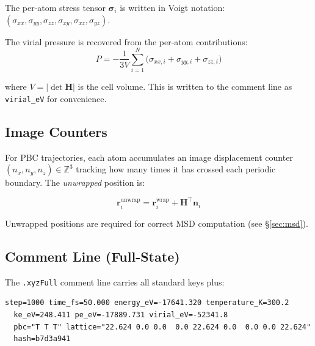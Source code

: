 \documentclass[11pt, a4paper, oneside]{article}
\newcommand{\rvec}{\mathbf{r}}
\begin{document}
The per-atom stress tensor $\boldsymbol{\sigma}_i$ is written in Voigt
notation: $({\sigma_{xx}}, {\sigma_{yy}}, {\sigma_{zz}},
{\sigma_{xy}}, {\sigma_{xz}}, {\sigma_{yz}})$.

The virial pressure is recovered from the per-atom contributions:
\begin{equation}
  P = -\frac{1}{3V} \sum_{i=1}^{N}
      \bigl(\sigma_{xx,i} + \sigma_{yy,i} + \sigma_{zz,i}\bigr)
  \label{eq:pressure}
\end{equation}

where $V = |\det\mathbf{H}|$ is the cell volume. This is written to the
comment line as \texttt{virial\_eV} for convenience.

\subsection{Image Counters}
\label{sec:xyzFull_images}

For PBC trajectories, each atom accumulates an image displacement counter
$(n_x, n_y, n_z) \in \mathbb{Z}^3$ tracking how many times it has crossed
each periodic boundary. The \emph{unwrapped} position is:

\begin{equation}
  \rvec_i^{\mathrm{unwrap}} = \rvec_i^{\mathrm{wrap}} + \mathbf{H}^\top \mathbf{n}_i
  \label{eq:unwrap}
\end{equation}

Unwrapped positions are required for correct MSD computation
(see \S\ref{sec:msd}).

\subsection{Comment Line (Full-State)}
\label{sec:xyzFull_comment}

The \texttt{.xyzFull} comment line carries all standard keys plus:

\begin{lstlisting}[caption={\texttt{.xyzFull} comment line.}]
step=1000 time_fs=50.000 energy_eV=-17641.320 temperature_K=300.2
  ke_eV=248.411 pe_eV=-17889.731 virial_eV=-52341.8
  pbc="T T T" lattice="22.624 0.0 0.0  0.0 22.624 0.0  0.0 0.0 22.624"
  hash=b7d3a941
\end{lstlisting}
\end{document}
